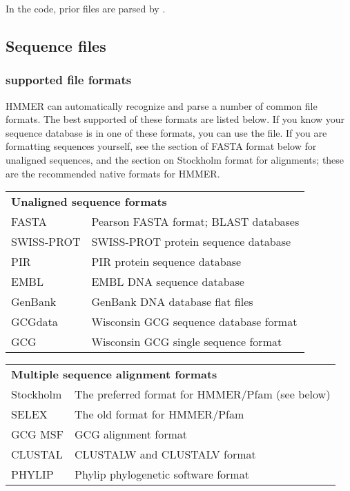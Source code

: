 In the code, prior files are parsed by .

\subsection{Sequence files}

\subsubsection{supported file formats}
 
HMMER can automatically recognize and parse a number of common file
formats. The best supported of these formats are listed below. If you
know your sequence database is in one of these formats, you can use
the file. If you are formatting sequences yourself, see the section of
FASTA format below for unaligned sequences, and the section on
Stockholm format for alignments; these are the recommended native
formats for HMMER.

\begin{tabular}{ll}
\multicolumn{2}{l}{\textbf{Unaligned sequence formats}} \\
FASTA      & Pearson FASTA format; BLAST databases \\
SWISS-PROT & SWISS-PROT protein sequence database\\ 
PIR        & PIR protein sequence database \\
EMBL       & EMBL DNA sequence database \\
GenBank    & GenBank DNA database flat files\\
GCGdata    & Wisconsin GCG sequence database format \\
GCG        & Wisconsin GCG single sequence format \\
\end{tabular}

\begin{tabular}{ll}
\multicolumn{2}{l}{\textbf{Multiple sequence alignment formats}}\\
Stockholm & The preferred format for HMMER/Pfam (see below)\\
SELEX     & The old format for HMMER/Pfam\\
GCG MSF   &   GCG alignment format \\
CLUSTAL   &   CLUSTALW and CLUSTALV format \\
PHYLIP    &   Phylip phylogenetic software format \\
\end{tabular}

